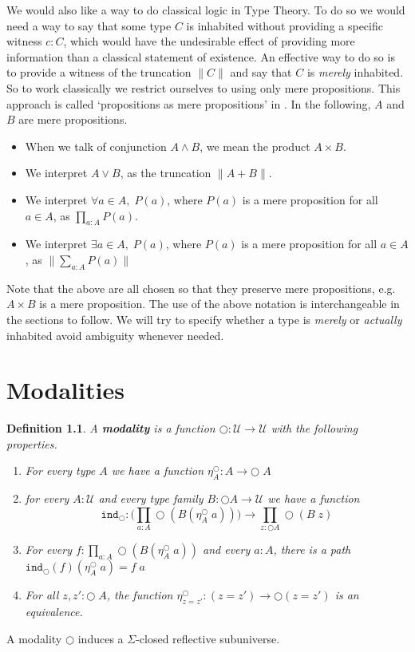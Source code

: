 \documentclass[12pt]{report}
\newtheorem{defn}[thm]{Definition}
\begin{document}
We would also like a way to do classical logic in Type Theory. 
To do so we would need a way to say that some type $C$ is inhabited without providing a specific witness $c : C$, which would have the undesirable effect of providing more information than a classical statement of existence. 
An effective way to do so is to provide a witness of the truncation $\lVert C \rVert$ and say that $C$ is \textit{merely} inhabited. 
So to work classically we restrict ourselves to using only mere propositions. 
This approach is called `propositions as mere propositions' in \cite{hottbook}. 
In the following, $A$ and $B$ are mere propositions.
\begin{itemize}
\item When we talk of conjunction $A \wedge B$, we mean the product $A \times B$. 
\item We interpret $A \vee B$, as the truncation $\| A + B\|$.
\item We interpret $\forall a\in A,\; P(a)$, where $P(a)$ is a mere proposition for all $a \in A$, as $\prod_{a : A}P(a)$. 
\item We interpret $ \exists a \in A,\; P(a)$, where $P(a)$ is a mere proposition for all $a \in A$, as $\| \sum_{a : A} P(a) \|$
\end{itemize}
Note that the above are all chosen so that they preserve mere propositions, e.g. $A\times B$ is a mere proposition. 
The use of the above notation is interchangeable in the sections to follow. 
We will try to specify whether a type is \textit{merely} or \textit{actually} inhabited avoid ambiguity whenever needed. 

\chapter{Modalities}
\begin{defn}\label{modality_definition}
A \textbf{modality} is a function $\bigcirc : \mathcal{U} \rightarrow \mathcal{U}$ with the following properties.
\begin{enumerate}
	\item For every type $A$ we have a function $\eta_A^\bigcirc : A \rightarrow \bigcirc\; A$
	\item for every $A : \mathcal{U}$ and every type family $B : \bigcirc A \rightarrow \mathcal{U}$ we have a function
	$$\mathtt{ind}_\bigcirc : \Big( \prod_{a : A}\bigcirc (B (\eta_A^\bigcirc\; a)) \Big) \rightarrow \prod_{z : \bigcirc A} \bigcirc (B\; z)$$
	\item For every $f : \prod_{a : A} \bigcirc (B(\eta_A^\bigcirc\; a))$ and every $a : A$, there is a path $\mathtt{ind}_\bigcirc (f)(\eta_A^\bigcirc\; a) = f\; a$
	\item For all $z,z' : \bigcirc \; A$, the function $\eta_{z=z'}^\bigcirc : (z = z') \rightarrow \bigcirc (z = z')$ is an equivalence.

\end{enumerate}
\end{defn}
A modality $\bigcirc$ induces a $\Sigma$-closed reflective subuniverse.
\end{document}
